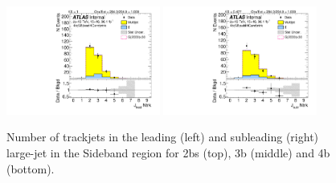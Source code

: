 \begin{figure}[htbp!]
\begin{center}
\includegraphics[width=0.45\textwidth,angle=-90]{figures/boosted/Sideband/b77_FourTag_Sideband_leadHCand_ntrk.pdf}
\includegraphics[width=0.45\textwidth,angle=-90]{figures/boosted/Sideband/b77_FourTag_Sideband_sublHCand_ntrk.pdf}
  \caption{Number of trackjets in the leading (left) and subleading (right) large-\R jet in the Sideband region for 2bs (top), 3b (middle) and 4b (bottom).}
  \label{fig:boosted-ntrk-Sideband}
\end{center}
\end{figure}

